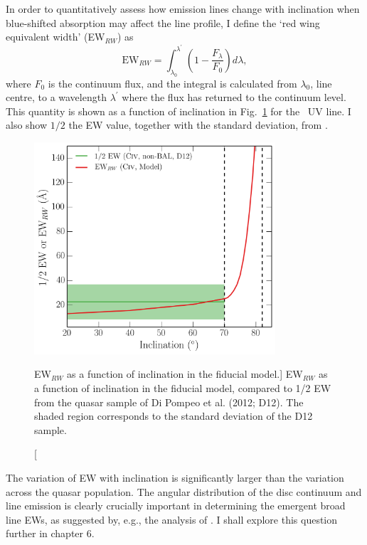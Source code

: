 In order to quantitatively assess how emission lines change with 
inclination when blue-shifted absorption 
may affect the line profile, I define the `red wing equivalent width' (EW$_{RW}$) as
\begin{equation}
\mathrm{EW}_{RW} = \int_{\lambda_0}^{\lambda^\prime} \left( 1 - \frac{F_\lambda}{F_0} \right) d\lambda,
\label{rwew}
\end{equation}
where $F_0$ is the continuum flux, and the integral is calculated from $\lambda_0$, line centre,
to a wavelength $\lambda^\prime$ where the flux has returned to the continuum level.
This quantity is shown as a function of inclination in Fig.~\ref{fig:ew_in_model} for the \civ\ UV line.
I also show $1/2$ the EW value, together with the standard deviation, from \cite{dipompeo2012b}.

\begin{figure}
\centering
\includegraphics[width=0.8\textwidth]{figures/ewpaper/ew.png}
\caption
[EW$_{RW}$ as a function of inclination in the fiducial model.]
{
EW$_{RW}$ as a function of inclination in the fiducial model, compared
to 1/2 EW from the quasar sample of Di Pompeo et al. (2012; D12). The shaded region
corresponds to the standard deviation of the D12 sample.
}
\label{fig:ew_in_model}
\end{figure}

The variation of EW with inclination is significantly 
larger than the variation across the quasar population.
The angular distribution of the disc 
continuum and line emission is clearly crucially important in 
determining the emergent broad line EWs, as suggested by, e.g., 
the analysis of \cite{risaliti2011}. 
I shall explore this question further in chapter 6.  

